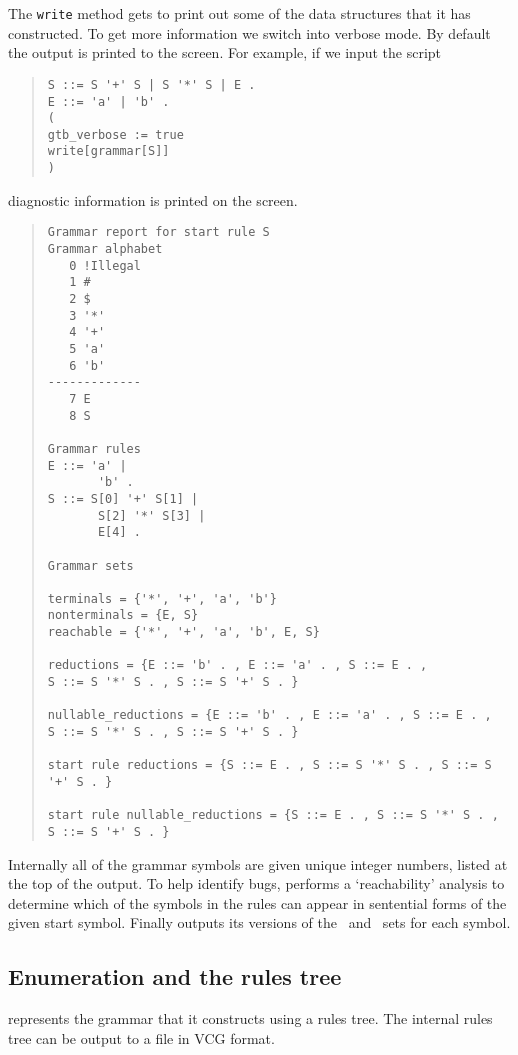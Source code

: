The \verb&write& method gets \gtb to print out some of
the data structures that it has constructed. 
To get more information we switch into verbose mode.
By default the output is printed to the screen.
For example, if we input the script
\begin{quote}
\begin{verbatim}
S ::= S '+' S | S '*' S | E .
E ::= 'a' | 'b' .
(
gtb_verbose := true
write[grammar[S]]
)
\end{verbatim}
\end{quote}
diagnostic information is printed on the screen. 
{\small
\begin{quote}
\begin{verbatim}
Grammar report for start rule S
Grammar alphabet
   0 !Illegal
   1 #
   2 $
   3 '*'
   4 '+'
   5 'a'
   6 'b'
-------------
   7 E
   8 S

Grammar rules
E ::= 'a' |
       'b' .
S ::= S[0] '+' S[1] |
       S[2] '*' S[3] |
       E[4] .

Grammar sets

terminals = {'*', '+', 'a', 'b'}
nonterminals = {E, S}
reachable = {'*', '+', 'a', 'b', E, S}

reductions = {E ::= 'b' . , E ::= 'a' . , S ::= E . , 
S ::= S '*' S . , S ::= S '+' S . }

nullable_reductions = {E ::= 'b' . , E ::= 'a' . , S ::= E . , 
S ::= S '*' S . , S ::= S '+' S . }

start rule reductions = {S ::= E . , S ::= S '*' S . , S ::= S '+' S . }

start rule nullable_reductions = {S ::= E . , S ::= S '*' S . , 
S ::= S '+' S . }
\end{verbatim}%
\end{quote}}\noindent
Internally all of the grammar symbols 
are given unique integer numbers, listed at the
top of the output. To help identify bugs,
\gtb performs a `reachability' analysis to determine
which of the symbols in the rules can appear in sentential forms of
the given start symbol.
Finally \gtb outputs its versions of the \first\ and \follow\ sets for
each symbol.


\subsection{Enumeration and the rules tree}

\gtb represents the grammar that it constructs using a rules tree. 
The internal rules tree can be output to a file in VCG format.

